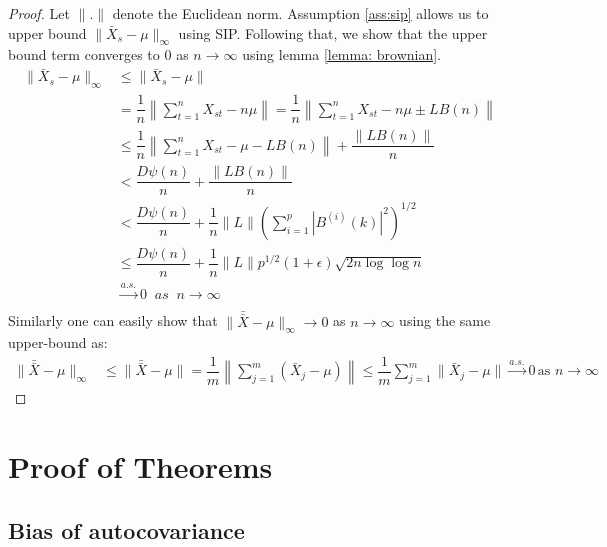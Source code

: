 \documentclass[11pt]{article}
\theoremstyle{remark}
\begin{document}
\begin{proof}
Let $\|.\|$ denote the Euclidean norm. Assumption \ref{ass:sip} allows us to upper bound $\|\bar{X}_s - \mu\|_{\infty}$ using SIP. Following that, we show that the upper bound term converges to 0 as $n \to \infty$ using lemma \ref{lemma: brownian}.
 \begin{align*}
    \|\bar{X}_s - \mu\|_{\infty} & \leq \|\bar{X}_s - \mu\| \\
    &= \dfrac{1}{n}\left\|\sum_{t=1}^{n}X_{st} - n\mu\right\| = \dfrac{1}{n}  \left \|\sum_{t=1}^{n}X_{st} - n\mu \pm L B(n) \right\|\\
    & \leq \dfrac{1}{n}\left\|\sum_{t=1}^{n}X_{st} - \mu - L B(n)\right\| + \dfrac{\left\|L B(n)\right\|}{n}\\
    &< \dfrac{D\psi(n)}{n} + \dfrac{\|L B(n)\|}{n}\\
    &< \dfrac{D\psi(n)}{n} + \dfrac{1}{n}\|L\| \left(\sum\limits_{i=1}^{p}|B^{(i)}(k)|^2\right)^{1/2}\\
    & \leq \dfrac{D\psi(n)}{n} + \dfrac{1}{n}\|L\| p^{1/2}(1+\epsilon)\sqrt{2n \log\log n}\\
    & \xrightarrow[]{a.s.} 0\;\; as \;\; n\to \infty
 \end{align*}
%
Similarly one can easily show that $\|\bar{\bar{X}} - \mu\|_{\infty} \to 0$ as $n \to \infty$ using the same upper-bound as:
% 
\begin{align*}
    \|\bar{\bar{X}} - \mu\|_{\infty} & \leq \|\bar{\bar{X}} - \mu\| = \dfrac{1}{m}\left \|\sum_{j=1}^{m}(\bar{X}_j- \mu) \right\| \leq \dfrac{1}{m}\sum_{j=1}^{m}\|\bar{X}_j - \mu\| \xrightarrow{a.s.} 0 \, \textrm{as } n \to \infty 
\end{align*}
\end{proof}


\section{Proof of Theorems} \label{appendix:A}

\subsection{Bias of autocovariance} \label{appendix:bias}
\end{document}
